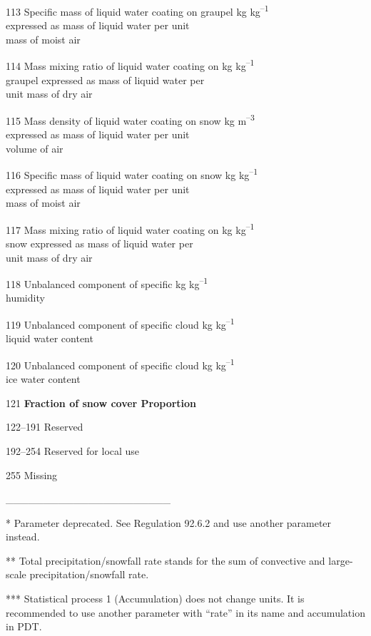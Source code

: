 113 Specific mass of liquid water coating on graupel kg kg\textsuperscript{--1}\\
expressed as mass of liquid water per unit\\
mass of moist air

114 Mass mixing ratio of liquid water coating on kg kg\textsuperscript{--1}\\
graupel expressed as mass of liquid water per\\
unit mass of dry air

115 Mass density of liquid water coating on snow kg m\textsuperscript{--3}\\
expressed as mass of liquid water per unit\\
volume of air

116 Specific mass of liquid water coating on snow kg kg\textsuperscript{--1}\\
expressed as mass of liquid water per unit\\
mass of moist air

117 Mass mixing ratio of liquid water coating on kg kg\textsuperscript{--1}\\
snow expressed as mass of liquid water per\\
unit mass of dry air

118 Unbalanced component of specific kg kg\textsuperscript{--1}\\
humidity

119 Unbalanced component of specific cloud kg kg\textsuperscript{--1}\\
liquid water content

120 Unbalanced component of specific cloud kg kg\textsuperscript{--1}\\
ice water content

121 \textbf{Fraction of snow cover Proportion}

122--191 Reserved

192--254 Reserved for local use

255 Missing

\_\_\_\_\_\_\_\_\_\_\_\_\_\_\_\_\_\_\_\_\_\_

* Parameter deprecated. See Regulation 92.6.2 and use another parameter instead.

** Total precipitation/snowfall rate stands for the sum of convective and large-scale precipitation/snowfall rate.

*** Statistical process 1 (Accumulation) does not change units. It is recommended to use another parameter with ``rate'' in its name and accumulation in PDT.

